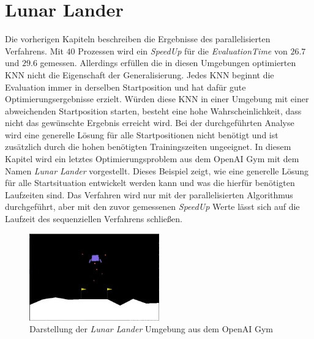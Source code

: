 \section{Lunar Lander}
Die vorherigen Kapiteln beschreiben die Ergebnisse des parallelisierten Verfahrens. Mit $40$ Prozessen wird ein \emph{SpeedUp} für die \emph{EvaluationTime} von $26.7$ und $29.6$ gemessen. Allerdings erfüllen die in diesen Umgebungen optimierten \ac{KNN} nicht die Eigenschaft der Generalisierung. Jedes \ac{KNN} beginnt die Evaluation immer in derselben Startposition und hat dafür gute Optimierungsergebnisse erzielt. Würden diese \ac{KNN} in einer Umgebung mit einer abweichenden Startposition starten, besteht eine hohe Wahrscheinlichkeit, dass nicht das gewünschte Ergebnis erreicht wird. Bei der durchgeführten Analyse wird eine generelle Lösung für alle Startpositionen nicht benötigt und ist zusätzlich durch die hohen benötigten Trainingszeiten ungeeignet. In diesem Kapitel wird ein letztes Optimierungsproblem aus dem OpenAI Gym mit dem Namen \emph{Lunar Lander} vorgestellt. Dieses Beispiel zeigt, wie eine generelle Lösung für alle Startsituation entwickelt werden kann und was die hierfür benötigten Laufzeiten sind. Das Verfahren wird nur mit der parallelisierten Algorithmus durchgeführt, aber mit den zuvor gemessenen \emph{SpeedUp} Werte lässt sich auf die Laufzeit des sequenziellen Verfahrens schließen.
\begin{figure}[!h]
	\centering
	\includegraphics[width=0.5\textwidth]{./img/lunar_lander_env.JPG} 
	\caption{Darstellung der \emph{Lunar Lander} Umgebung aus dem OpenAI Gym}
	\label{fig:lunar_lander_env}
\end{figure} 
\\\\
